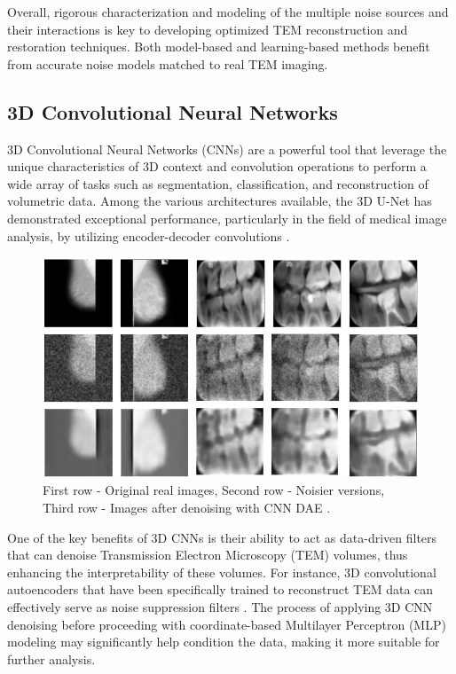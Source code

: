 Overall, rigorous characterization and modeling of the multiple noise sources and their interactions is key to developing optimized TEM reconstruction and restoration techniques. Both model-based and learning-based methods benefit from accurate noise models matched to real TEM imaging.

\clearpage

\subsection{3D Convolutional Neural Networks}
3D Convolutional Neural Networks (CNNs) are a powerful tool that leverage the unique characteristics of 3D context and convolution operations to perform a wide array of tasks such as segmentation, classification, and reconstruction of volumetric data. Among the various architectures available, the 3D U-Net has demonstrated exceptional performance, particularly in the field of medical image analysis, by utilizing encoder-decoder convolutions \cite{cicek2016}.


\vspace{10pt}


\begin{figure}[thbp]
    \centering
    \includegraphics[width=.6\textwidth]{img/3D Convolutional Neural Networks.png}
    \caption{First row - Original real images, Second row - Noisier versions, Third row - Images after denoising with CNN DAE \cite{cicek2016}.}\label{fig: Medical Image of 3D CNN Denoising}
\end{figure}

One of the key benefits of 3D CNNs is their ability to act as data-driven filters that can denoise Transmission Electron Microscopy (TEM) volumes, thus enhancing the interpretability of these volumes. For instance, 3D convolutional autoencoders that have been specifically trained to reconstruct TEM data can effectively serve as noise suppression filters \cite{Gondara}. The process of applying 3D CNN denoising before proceeding with coordinate-based Multilayer Perceptron (MLP) modeling may significantly help condition the data, making it more suitable for further analysis.
\vspace{10pt}

